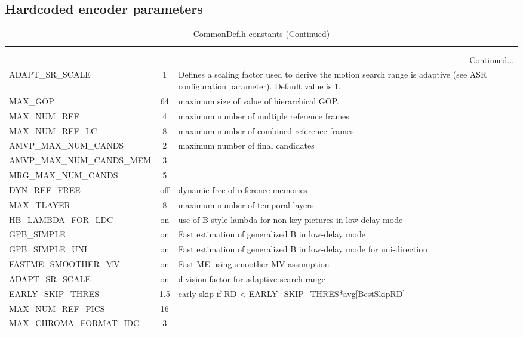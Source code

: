 \documentclass[a4paper,11pt]{jctvcdoc}
\makeatletter
\newcommand{\Option}[1]{\ifx\optOption\@empty\gdef\optOption{#1}\else\g@addto@macro\optOption{ \\ #1}\fi}
\newcommand{\Default}[1]{\ifx\optDefault\@empty\gdef\optDefault{#1}\else\g@addto@macro\optDefault{ \\ #1}\fi}
\newcommand{\clearOptions}{\gdef\optOption{}\gdef\optShortOption{}\gdef\optDefault{}}
\newenvironment{MacroTable}[1]{%
	\footnotesize
	\def\arraystretch{1.3}
	\clearOptions
	\begin{longtable}{lcp{0.5\textwidth}}
	 \caption{#1} \\
	 \hline
	  \thead{Option} &
	  \thead{Default} &
	  \thead{Description} \\
	 \hline
	\endfirsthead
	 \caption[]{#1 (Continued)} \\
	 \hline
	  \thead{Option} &
	  \thead{Default} &
	  \thead{Description} \\
	 \hline
	\endhead
	 \multicolumn{3}{r}{Continued...}\\
	 \hline
	\endfoot
	 \hline
	\endlastfoot
}{%
	\end{longtable}
}
\makeatother
\begin{document}

\subsection{Hardcoded encoder parameters}
\begin{MacroTable}{CommonDef.h constants}
ADAPT_SR_SCALE &
1 &
Defines a scaling factor used to derive the motion search range is
adaptive (see ASR configuration parameter). Default value is 1.
\\

MAX_GOP &
64 &
maximum size of value of hierarchical GOP.
\\

MAX_NUM_REF &
4 &
maximum number of multiple reference frames
\\

MAX_NUM_REF_LC &
8 &
maximum number of combined reference frames
\\

AMVP_MAX_NUM_CANDS &
2 &
maximum number of final candidates
\\

AMVP_MAX_NUM_CANDS_MEM &
3 &
\\

MRG_MAX_NUM_CANDS &
5 &
\\

DYN_REF_FREE &
off &
dynamic free of reference memories
\\

MAX_TLAYER &
8 &
maximum number of temporal layers
\\

HB_LAMBDA_FOR_LDC &
on &
use of B-style lambda for non-key pictures in low-delay mode
\\

GPB_SIMPLE &
on &
Fast estimation of generalized B in low-delay mode
\\

GPB_SIMPLE_UNI &
on &
Fast estimation of generalized B in low-delay mode for uni-direction
\\

FASTME_SMOOTHER_MV &
on &
Fast ME using smoother MV assumption
\\

ADAPT_SR_SCALE &
on &
division factor for adaptive search range
\\

EARLY_SKIP_THRES &
1.5 &
early skip if RD < EARLY_SKIP_THRES*avg[BestSkipRD]
\\

MAX_NUM_REF_PICS &
16 &
\\

MAX_CHROMA_FORMAT_IDC &
3 &
\\
\end{MacroTable}
\end{document}
